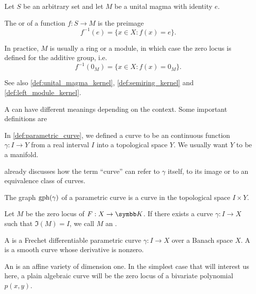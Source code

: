 \begin{definition}\label{def:zero_locus}
  Let \( S \) be an arbitrary set and let \( M \) be a unital magma with identity \( e \).

  The  or  of a function \( f: S \to M \) is the preimage
  \begin{equation*}
    f^{-1}(e) = \{ x \in X \colon f(x) = e \}.
  \end{equation*}

  In practice, \( M \) is usually a ring or a module, in which case the zero locus is defined for the additive group, i.e.
  \begin{equation*}
    f^{-1}(0_M) = \{ x \in X \colon f(x) = 0_M \}.
  \end{equation*}

  See also \cref{def:unital_magma_kernel}, \cref{def:semiring_kernel} and \cref{def:left_module_kernel}.
\end{definition}

\begin{definition}\label{def:geometric_curve}
  A  can have different meanings depending on the context. Some important definitions are

  \begin{defenum}
    \cite[definition 1.2]{Иванов2017} In \cref{def:parametric_curve}, we defined a curve to be an continuous function \( \gamma: I \to Y \) from a real interval \( I \) into a topological space \( Y \). We usually want \( Y \) to be a manifold.

     already discusses how the term \enquote{curve} can refer to \( \gamma \) itself, to its image or to an equivalence class of curves.

    \cite[definition 1.20]{Иванов2017} The graph \( \operatorname{gph}(\gamma) \) of a parametric curve is a curve in the topological space \( I \times Y \).

    \cite[definition 1.24]{Иванов2017} Let \( M \) be the zero locus of \( F: X \to \K \). If there exists a curve \( \gamma: I \to X \) such that \( \Im(M) = I \), we call \( M \) an .

     A  is a Frechet differentiable parametric curve \( \gamma: I \to X \) over a Banach space \( X \). A  is a smooth curve whose derivative is nonzero.

     An  is an affine variety of dimension one. In the simplest case that will interest us here, a plain algebraic curve will be the zero locus of a bivariate polynomial \( p(x, y) \).
  \end{defenum}
\end{definition}

